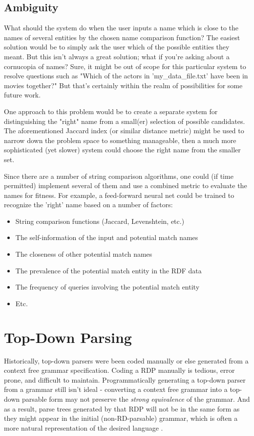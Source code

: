 \documentclass[11pt]{article}
\begin{document}
\subsection{Ambiguity}
What should the system do when the user inputs a name which is close
to the names of several entities by the chosen name comparison
function? The easiest solution would be to simply ask the user which
of the possible entities they meant. But this isn't always a great
solution; what if you're asking about a cornucopia of names?
Sure, it might be out of scope for this particular system to
resolve questions such as "Which of the actors in 'my\_data\_file.txt'
have been in movies together?" But that's certainly within the
realm of possibilities for some future work.

One approach to this problem would be to create a separate
system for distinguishing the "right" name from a small(er) selection
of possible candidates. The aforementioned Jaccard index (or similar
distance metric) might be used to narrow down the problem space
to something manageable, then a much more sophisticated (yet slower)
system could choose the right name from the smaller set.

Since there are a number of string comparison algorithms, one could
(if time permitted) implement several of them and use a combined
metric to evaluate the names for fitness. For example,
a feed-forward neural net could be trained to recognize the 'right'
name based on a number of factors:
\begin{itemize}
\item String comparison functions (Jaccard, Levenshtein, etc.)
\item The self-information \cite{shannon} of the input and potential match names
\item The closeness of other potential match names
\item The prevalence of the potential match entity in the RDF data
\item The frequency of queries involving the potential match entity
\item Etc.
\end{itemize}

\section{Top-Down Parsing}
Historically, top-down parsers were been coded manually or else generated from 
a context free grammar specification. \cite{lewis, formal_langs} 
Coding a RDP manually is tedious, error prone, and difficult to maintain.
Programmatically generating a top-down parser from a grammar
still isn't ideal - converting a context free grammar into
a top-down parsable form may not preserve the {\em strong equivalence} of the grammar.
And as a result, parse trees generated by that RDP will not be in the same form
as they might appear in the initial (non-RD-parsable) grammar, which is often a more 
natural representation of the desired language \cite{compiler}.
\end{document}

